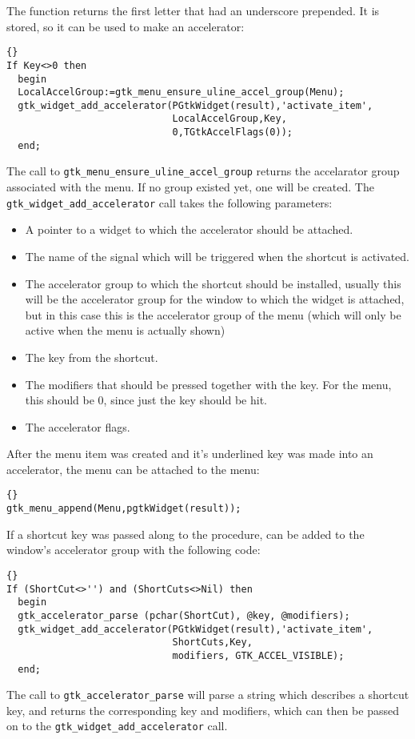 \documentclass[10pt]{article}
\begin{document}
The function returns the first letter that had an underscore prepended. It
is stored, so it can be used to make an accelerator:
\begin{lstlisting}{}
If Key<>0 then
  begin
  LocalAccelGroup:=gtk_menu_ensure_uline_accel_group(Menu);
  gtk_widget_add_accelerator(PGtkWidget(result),'activate_item',
                             LocalAccelGroup,Key,
                             0,TGtkAccelFlags(0));
  end;
\end{lstlisting}
The call to \lstinline|gtk_menu_ensure_uline_accel_group| returns the 
accelarator group associated with the menu. If no group existed yet, one
will be created. The \lstinline|gtk_widget_add_accelerator| call takes the
following parameters:
\begin{itemize}
\item A pointer to a widget to which the accelerator should be attached.
\item The name of the signal which will be triggered when the shortcut 
is activated.
\item The accelerator group to which the shortcut should be installed,
usually this will be the accelerator group for the window to which the
widget is attached, but in this case this is the accelerator group of the
menu (which will only be active when the menu is actually shown)
\item The key from the shortcut.
\item The modifiers that should be pressed together with the key. For the
menu, this should be 0, since just the key should be hit.
\item The accelerator flags.
\end{itemize}

After the menu item was created and it's underlined key was made into an
accelerator, the menu can be attached to the menu:
\begin{lstlisting}{}
gtk_menu_append(Menu,pgtkWidget(result));
\end{lstlisting}

If a shortcut key was passed along to the procedure, can be added to the
window's accelerator group with the following code:
\begin{lstlisting}{}
If (ShortCut<>'') and (ShortCuts<>Nil) then  
  begin
  gtk_accelerator_parse (pchar(ShortCut), @key, @modifiers);
  gtk_widget_add_accelerator(PGtkWidget(result),'activate_item',
                             ShortCuts,Key,
                             modifiers, GTK_ACCEL_VISIBLE);
  end;
\end{lstlisting}
The call to \lstinline|gtk_accelerator_parse| will parse a string which
describes a shortcut key, and returns the corresponding key and modifiers,
which can then be passed on to the \lstinline|gtk_widget_add_accelerator|
call.
\end{document}
